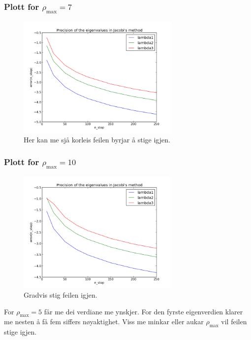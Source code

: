 \documentclass[11pt, a4paper]{article}
\begin{document}
    \subsubsection{Plott for $\rho_{\text{max}} = 7$}
      \begin{figure}[H]
        \centering
        \includegraphics[width=300px]{feil7.png}
        \caption{Her kan me sjå korleis feilen byrjar å stige igjen.}
      \end{figure}

    \subsubsection{Plott for $\rho_{\text{max}} = 10$}
      \begin{figure}[H]
        \centering
        \includegraphics[width=300px]{feil10.png}
        \caption{Gradvis stig feilen igjen.}
      \end{figure}

    For $\rho_{\text{max}} = 5$ får me dei verdiane me ynskjer. For den fyrste eigenverdien klarer me nesten å få fem siffers nøyaktighet. Viss me minkar eller aukar 
    $\rho_{\text{max}}$ vil feilen stige igjen.
\end{document}
